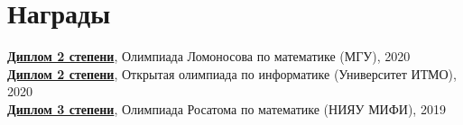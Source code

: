 \section{Награды}
\begin{itemize}[leftmargin=0.15in, label={}]
  \small{\item{
    \textbf{\href{https://theseems.ru/diploma/lomonosov2020}{Диплом 2 степени}}, Олимпиада Ломоносова по математике (МГУ), 2020 \\
    \textbf{\href{https://theseems.ru/diploma/open2020}{Диплом 2 степени}}, Открытая олимпиада по информатике (Университет ИТМО), 2020 \\
    \textbf{\href{https://theseems.ru/diploma/rosatom2019}{Диплом 3 степени}}, Олимпиада Росатома по математике (НИЯУ МИФИ), 2019
  }}
\end{itemize}